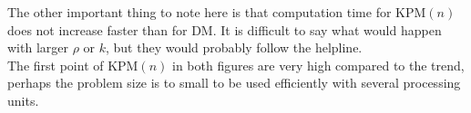 The other important thing to note here is that computation time for KPM$(n)$ does not increase faster than for DM. It is difficult to say what would happen with larger $\rho$ or $k$, but they would probably follow the helpline.\\

The first point of KPM$(n)$ in both figures are very high compared to the trend, perhaps the problem size is to small to be used efficiently with several processing units. 
